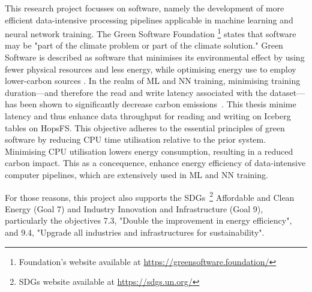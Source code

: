 This research project focusses on software, namely the development of more efficient data-intensive processing pipelines applicable in machine learning and neural network training. The Green Software Foundation \footnote{Foundation's website available at \url{https://greensoftware.foundation/}} states that software may be "part of the climate problem or part of the climate solution." Green Software is described as software that minimises its environmental effect by using fewer physical resources and less energy, while optimising energy use to employ lower-carbon sources \cite{WhatGreenSoftware2021}. In the realm of \gls{ML} and \gls{NN} training, minimising training duration—and therefore the read and write latency associated with the dataset—has been shown to significantly decrease carbon emissions~\cite{pattersonCarbonEmissionsLarge2021,pattersonCarbonFootprintMachine2022}. This thesis minime latency and thus enhance data throughput for reading and writing on Iceberg tables on \gls{HopsFS}. This objective adheres to the essential principles of green software by reducing \gls{CPU} time utilisation relative to the prior system. Minimising \gls{CPU} utilisation lowers energy consumption, resulting in a reduced carbon impact. This as a concequence, enhance energy efficiency of data-intensive computer pipelines, which are extensively used in \gls{ML} and \gls{NN} training.

For those reasons, this project also supports the \glspl{SDG}~\footnote{\glspl{SDG} website available at \url{https://sdgs.un.org/}} Affordable and Clean Energy (Goal 7) and Industry Innovation and Infrastructure (Goal 9), particularly the objectives 7.3, "Double the improvement in energy efficiency", and 9.4, "Upgrade all industries and infrastructures for sustainability".


